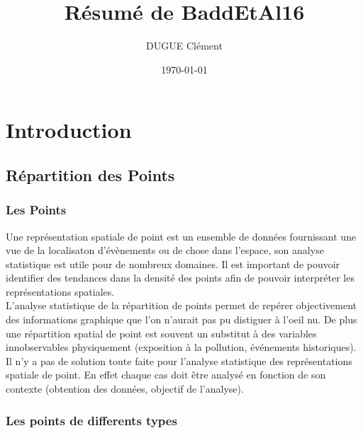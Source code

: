 \documentclass[french,12pt,a4paper]{report}
\title{Résumé de BaddEtAl16}
\author{DUGUE Clément}
\date{\today}
\begin{document}
\hypersetup{linkcolor=blue}
\maketitle
\tableofcontents


\chapter{Introduction}

\section{Répartition des Points}


\subsection{Les Points}
Une représentation spatiale de point est un ensemble de données fournissant une vue de la localisaton d'évènements ou de chose dans l'espace, son analyse statistique est utile pour de nombreux domaines. Il est important de pouvoir identifier des tendances dans la densité des points afin de pouvoir interpréter les représentations spatiales.\\

L'analyse statistique de la répartition de points permet de repérer objectivement des informations graphique que l'on n'aurait pas pu distiguer à l'oeil nu. De plus une répartition spatial de point est souvent un substitut à des variables innobservables physiquement (exposition à la pollution, événements historiques).\\

Il n'y a pas de solution toute faite pour l'analyse statistique des représentations spatiale de point. En effet chaque cas doit être analysé en fonction de son contexte (obtention des données, objectif de l'analyse).\\


\subsection{Les points de differents types}
\end{document}
